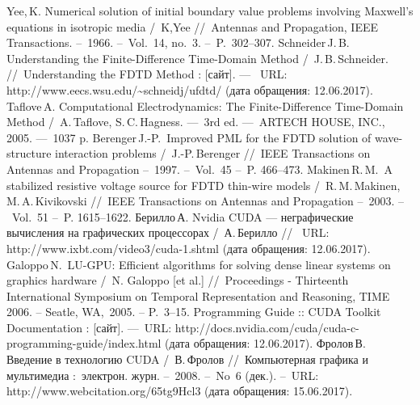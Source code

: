 {\def\section*#1{}
\begin{thebibliography}{99}
 Yee,\,K. Numerical solution of initial boundary value problems involving
Maxwell’s equations in isotropic media /~K,Yee //~Antennas and Propagation, IEEE Transactions. --~1966. --~Vol.~14, no.~3. --~P.~302--307.
 Schneider\,J.\,B. Understanding the Finite-Difference Time-Domain Method /~J.\,B.\,Schneider. //~Understanding the FDTD Method : [сайт]. ---~ URL: http://www.eecs.wsu.edu/\textasciitilde{}schneidj/ufdtd/ (дата обращения: 12.06.2017).
 Taflove\,A. Computational Electrodynamics: The Finite-Difference Time-Domain Method /~A.\,Taflove, S.\,C.\,Hagness. ---~3rd ed. ---~ARTECH HOUSE, INC., 2005. ---~1037 p.
 Berenger\,J.-P.~Improved PML for the FDTD solution of wave-structure interaction problems /~J.-P.\,Berenger //~IEEE Transactions on Antennas and Propagation --~1997. --~Vol.~45 --~P. 466--473.
 Makinen\,R.\,M.~A stabilized resistive voltage source for FDTD thin-wire models /~R.\,M.\,Makinen, M.\,A.\,Kivikovski //~IEEE Transactions on Antennas and Propagation --~2003. --~Vol.~51 --~P. 1615--1622.
 Берилло\,А. Nvidia CUDA --- неграфические вычисления на графических процессорах /~А.\,Берилло //~ URL: http://www.ixbt.com/video3/cuda-1.shtml  (дата обращения: 12.06.2017).
 Galoppo\,N.~LU-GPU: Efficient algorithms for solving dense linear systems on graphics hardware /~N. Galoppo [et al.] //~Proceedings - Thirteenth International Symposium on Temporal Representation and Reasoning, TIME 2006. -- Seatle, WA,~2005. -- P.~3--15.
 Programming Guide :: CUDA Toolkit Documentation : [сайт]. ---~URL: http://docs.nvidia.com/cuda/cuda-c-programming-guide/index.html (дата обращения: 12.06.2017).
 Фролов\,В. Введение в технологию CUDA /~В.\,Фролов //~Компьютерная графика и мультимедиа :~электрон. журн. --~2008. --~No~6 (дек.). --~URL: http://www.webcitation.org/65tg9Hcl3 (дата обращения: 15.06.2017).
\end{thebibliography}
}
\clearpage

